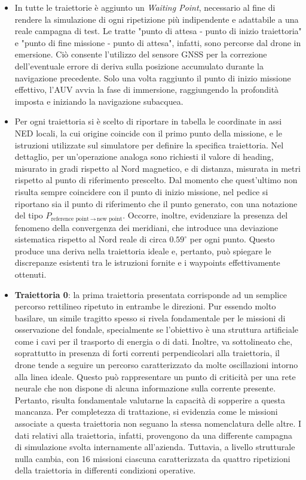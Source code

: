     \begin{itemize}

        \item[\emph{N.B.}] In tutte le traiettorie è aggiunto un \emph{Waiting Point}, necessario al fine di rendere la simulazione di ogni ripetizione più indipendente e adattabile a una reale campagna di test. Le tratte "punto di attesa - punto di inizio traiettoria" e "punto di fine missione - punto di attesa", infatti, sono percorse dal drone in emersione. Ciò consente l'utilizzo del sensore GNSS per la correzione dell'eventuale errore di deriva sulla posizione accumulato durante la navigazione precedente. Solo una volta raggiunto il punto di inizio missione effettivo, l'AUV avvia la fase di immersione, raggiungendo la profondità imposta e iniziando la navigazione subacquea. 
        
        \item[\emph{N.B.}] Per ogni traiettoria si è scelto di riportare in tabella le coordinate in assi NED locali, la cui origine coincide con il primo punto della missione, e le istruzioni utilizzate sul simulatore per definire la specifica traiettoria. Nel dettaglio, per un'operazione analoga sono richiesti il valore di heading, misurato in gradi rispetto al Nord magnetico, e di distanza, misurata in metri rispetto al punto di riferimento prescelto. Dal momento che quest'ultimo non risulta sempre coincidere con il punto di inizio missione, nel pedice si riportano sia il punto di riferimento che il punto generato, con una notazione del tipo $P_{\text{reference point} \, \rightarrow \, \text{new point}}$. Occorre, inoltre, evidenziare la presenza del fenomeno della convergenza dei meridiani, che introduce una deviazione sistematica rispetto al Nord reale di circa $0.59^\circ$ per ogni punto. Questo produce una deriva nella traiettoria ideale e, pertanto, può spiegare le discrepanze esistenti tra le istruzioni fornite e i waypoints effettivamente ottenuti. 

        \item \textbf{Traiettoria 0}: la prima traiettoria presentata corrisponde ad un semplice percorso rettilineo ripetuto in entrambe le direzioni. Pur essendo molto basilare, un simile tragitto spesso si rivela fondamentale per le missioni di osservazione del fondale, specialmente se l'obiettivo è una struttura artificiale come i cavi per il trasporto di energia o di dati. Inoltre, va sottolineato che, soprattutto in presenza di forti correnti perpendicolari alla traiettoria, il drone tende a seguire un percorso caratterizzato da molte oscillazioni intorno alla linea ideale. Questo può rappresentare un punto di criticità per una rete neurale che non dispone di alcuna informazione sulla corrente presente. Pertanto, risulta fondamentale valutarne la capacità di sopperire a questa mancanza. Per completezza di trattazione, si evidenzia come le missioni associate a questa traiettoria non seguano la stessa nomenclatura delle altre. I dati relativi alla traiettoria, infatti, provengono da una differente campagna di simulazione svolta internamente all'azienda. Tuttavia, a livello strutturale nulla cambia, con 16 missioni ciascuna caratterizzata da quattro ripetizioni della traiettoria in differenti condizioni operative.
        

\end{itemize}
